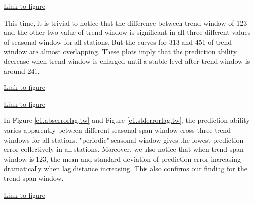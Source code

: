 \begin{framed}
\begin{center}
  \href{../plots/a1950/E2/tmax.std.vs.lag.sw.pdf}{Link to figure}
  \label{e2.stderrorlag.sw}
\end{center}
\end{framed}

This time, it is trivial to notice that the difference between trend window of 
123 and the other two value of trend window is significant in all three different 
values of seasonal window for all stations. But the curves for 313 and 451 of 
trend window are almost overlapping. These plots imply that the prediction ability
decrease when trend window is enlarged until a stable level after trend window 
is around 241.

\begin{framed}
\begin{center}
  \href{../plots/a1950/E2/tmax.absmeans.vs.lag.tw.pdf}{Link to figure}
  \label{e2.abserrorlag.tw}
\end{center}
\end{framed}

\begin{framed}
\begin{center}
  \href{../plots/a1950/E2/tmax.std.vs.lag.tw.pdf}{Link to figure}
  \label{e2.stderrorlag.tw}
\end{center}
\end{framed}

In Figure 
\href{../plots/a1950/E2/tmax.absmeans.vs.lag.tw.pdf}{\ref*{e1.abserrorlag.tw}} 
and Figure 
\href{../plots/a1950/E2/tmax.std.vs.lag.tw.pdf}{\ref*{e1.stderrorlag.tw}},
the prediction ability varies apparently between different seasonal span window
cross three trend windows for all stations. "periodic" seasonal window gives
the lowest prediction error collectively in all stations. Moreover, we also notice
that when trend span window is 123, the mean and standard deviation of prediction
error increasing dramatically when lag distance increasing. This also confirms
our finding for the trend span window. 

\begin{framed}
\begin{center}
  \href{../plots/a1950/E2/tmax.mean.absmeans.error.sw.pdf}{Link to figure}
  \label{e2.abserror.sw}
\end{center}
\end{framed}

